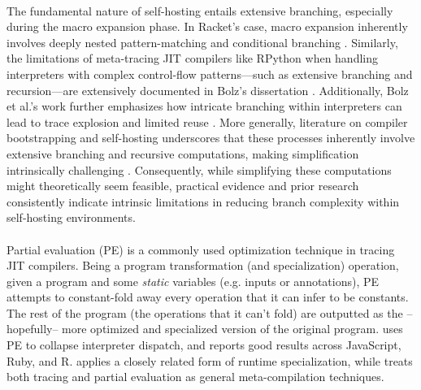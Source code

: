   \paragraph{}%
    The fundamental nature of self-hosting entails extensive branching, especially during the macro expansion phase. In Racket's case, macro expansion inherently involves deeply nested pattern-matching and conditional branching \cite{icfp2019}. Similarly, the limitations of meta-tracing JIT compilers like RPython when handling interpreters with complex control-flow patterns—such as extensive branching and recursion—are extensively documented in Bolz's dissertation \cite{bolzPhDThesis}. Additionally, Bolz et al.'s work further emphasizes how intricate branching within interpreters can lead to trace explosion and limited reuse \cite{pypy-main}. More generally, literature on compiler bootstrapping and self-hosting underscores that these processes inherently involve extensive branching and recursive computations, making simplification intrinsically challenging \cite{appelCompilingContinuations2007}. Consequently, while simplifying these computations might theoretically seem feasible, practical evidence and prior research consistently indicate intrinsic limitations in reducing branch complexity within self-hosting environments.


  \paragraph{}%
    Partial evaluation (PE) is a commonly used optimization technique in tracing JIT compilers. Being a program transformation (and specialization) operation, given a program and some \emph{static} variables (e.g. inputs or annotations), PE attempts to constant-fold away every operation that it can infer to be constants. The rest of the program (the operations that it can't fold) are outputted as the --hopefully-- more optimized and specialized version of the original program. \cite{truffle-graal} uses PE to collapse interpreter dispatch, and \cite{practical-partial} reports good results across JavaScript, Ruby, and R.  \cite{traceMonkey} applies a closely related form of runtime specialization, while \cite{trace-vs-PE} treats both tracing and partial evaluation as general meta-compilation techniques.

